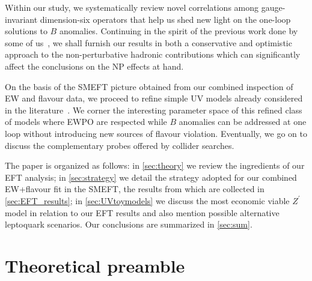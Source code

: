 Within our study, we systematically review novel correlations among gauge-invariant dimension-six operators that help us shed new light on the one-loop solutions to $B$ anomalies. Continuing in the spirit of the previous work done by some of us~\cite{Ciuchini:2015qxb,Ciuchini:2016weo,Ciuchini:2017mik,Ciuchini:2017gva,Ciuchini:2018xll,Ciuchini:2018anp,Ciuchini:2019usw}, we shall furnish our results in both a conservative and optimistic approach to the non-perturbative hadronic contributions which can significantly affect the conclusions on the NP effects at hand.

On the basis of the SMEFT picture obtained from our combined inspection of EW and flavour data, we proceed to refine simple UV models already considered in the literature~\cite{Kamenik:2017tnu,Fox:2018ldq,Celis:2017doq}. We corner the interesting parameter space of this refined class of models where EWPO are respected while $B$ anomalies can be addressed {at one loop without introducing new sources of flavour violation}. Eventually, we go on to discuss the complementary probes offered by collider searches.

The paper is organized as follows: in \autoref{sec:theory} we review the ingredients of our EFT analysis; in \autoref{sec:strategy} we detail the strategy adopted for our combined EW+flavour fit in the SMEFT, the results from which are collected in \autoref{sec:EFT_results}; in \autoref{sec:UVtoymodels} we discuss the most economic viable $Z^{\prime}$ model in relation to our EFT results and also mention possible alternative leptoquark scenarios. Our conclusions are summarized in \autoref{sec:sum}.

\section{Theoretical preamble}
\label{sec:theory}

